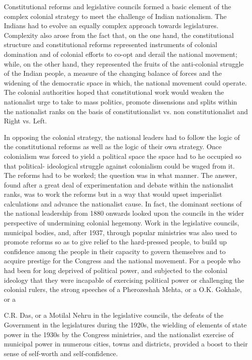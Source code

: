 Constitutional reforms and legislative councils formed a basic element of the complex colonial strategy to meet the challenge of Indian nationalism. The Indians had to evolve an equally complex approach towards legislatures. Complexity also arose from the fact that, on the one hand, the constitutional structure and constitutional reforms represented instruments of colonial domination and of colonial efforts to co-opt and derail the national movement; while, on the other hand, they represented the fruits of the anti-colonial struggle of the Indian people, a measure of the changing balance of forces and the widening of the democratic space in which, the national movement could operate. The colonial authorities hoped that constitutional work would weaken the nationalist urge to take to mass politics, promote dissensions and splits within the nationalist ranks on the basis of constitutionalist vs. non­ constitutionalist and Right vs. Left. 

In opposing the colonial strategy, the national leaders had to follow the logic of the constitutional reforms as well as the logic of their own strategy. Once colonialism was forced to yield a political space the space had to he occupied so that political- ideological struggle against colonialism could be waged from it. The reforms had to be worked; the question was in what manner. The answer, found after a great deal of experimentation and debate within the nationalist ranks, was to work the reforms but in a way that would upset imperialist calculations and advance the nationalist cause. In fact, the dominant sections of the national leadership from 1880 onwards looked upon the councils in the wider perspective of undermining colonial hegemony. Work in the legislative councils, municipal bodies, and, after 1937, through popular ministries was also used to promote reforms so as to give relief to the hard-pressed people, to build up confidence among the people in their capacity to govern themselves and to acquire prestige for the Congress and the national movement. For a people who had been for long deprived of political power, and subjected to the colonial ideology that they were incapable of exercising political power or challenging the colonial rulers, the strong speeches of a Pherozeshah Mehta, or a O.K. Gokhale, or a 

C.R. Das, or a Motilal Nehru in the legislative councils, the defeats of the Government in the legislatures during the 1920s, the wielding of elements of state power in the 1930s by the Congress ministries, and the nationalist exercise of municipal power in numerous cities, towns and districts, provided a boost to their sense of self-worth and self-confidence. 

